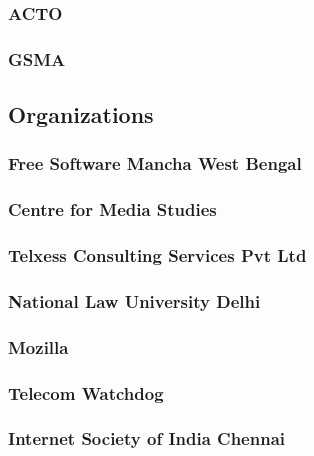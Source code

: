 \documentclass{article}
\begin{document}
\subsubsection{ACTO}


\subsubsection{GSMA}



\subsection{Organizations}
\subsubsection{Free Software Mancha West Bengal}


\subsubsection{Centre for Media Studies}


\subsubsection{Telxess Consulting Services Pvt Ltd}


\subsubsection{National Law University Delhi}


\subsubsection{Mozilla}


\subsubsection{Telecom Watchdog}


\subsubsection{Internet Society of India Chennai}

\end{document}
